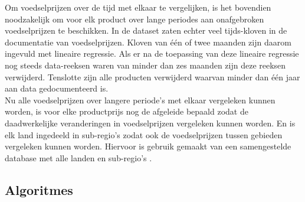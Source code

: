 \documentclass{article}
\begin{document}

Om voedselprijzen over de tijd met elkaar te vergelijken, is het bovendien noodzakelijk om voor elk product over lange periodes aan onafgebroken voedselprijzen te beschikken. In de dataset zaten echter veel tijds-kloven in de documentatie van voedselprijzen. Kloven van één of twee maanden zijn daarom ingevuld met lineaire regressie. Als er na de toepassing van deze lineaire regressie nog steeds data-reeksen waren van minder dan zes maanden zijn deze reeksen verwijderd. Tenslotte zijn alle producten verwijderd waarvan minder dan één jaar aan data gedocumenteerd is.\\


Nu alle voedselprijzen over langere periode's met elkaar vergeleken kunnen worden, is voor elke productprijs nog de afgeleide bepaald zodat de daadwerkelijke veranderingen in voedselprijzen vergeleken kunnen worden. En is elk land ingedeeld in sub-regio’s zodat ook de voedselprijzen tussen gebieden vergeleken kunnen worden. Hiervoor is gebruik gemaakt van een samengestelde database met alle landen en sub-regio's \cite{region1, region2}. 

\subsection*{Algoritmes}
\end{document}

